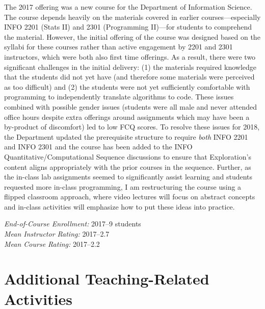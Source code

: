 \documentclass[11pt]{article}
\begin{document}
The 2017 offering was a new course for the Department of Information Science. The course depends heavily on the materials covered in earlier courses---especially INFO 2201 (Stats II) and 2301 (Programming II)---for students to comprehend the material. However, the initial offering of the course was designed based on the syllabi for these courses rather than active engagement by 2201 and 2301 instructors, which were both also first time offerings. As a result, there were two significant challenges in the initial delivery: (1) the materials required knowledge that the students did not yet have (and therefore some materials were perceived as too difficult) and (2) the students were not yet sufficiently comfortable with programming to independently translate algorithms to code.
 These issues combined with possible gender issues (students were all male and never attended office hours despite extra offerings around assignments which may have been a by-product of discomfort) led to low FCQ scores. To resolve these issues for 2018, the Department updated the prerequisite structure to require \emph{both} INFO 2201 and INFO 2301 and the course has been added to the INFO Quantitative/Computational Sequence discussions to ensure that Exploration's content aligns appropriately with the prior courses in the sequence. Further, as the in-class lab assignments seemed to significantly assist learning and students requested more in-class programming, I am restructuring the course using a flipped classroom approach, where video lectures will focus on abstract concepts and in-class activities will emphasize how to put these ideas into practice. 

\emph{End-of-Course Enrollment: }2017--9 students\\
\emph{Mean Instructor Rating:} 2017--2.7\\
\emph{Mean Course Rating:} 2017--2.2

\section*{Additional Teaching-Related Activities}
\end{document}
